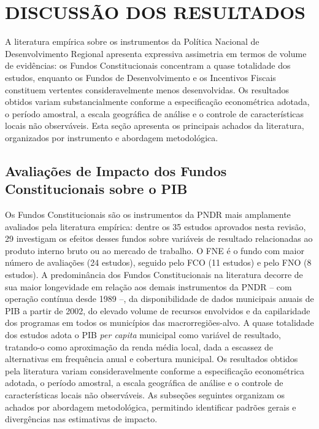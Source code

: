 
\section{DISCUSSÃO DOS RESULTADOS}
\label{sec:results_syst_review}

A literatura empírica sobre os instrumentos da Política Nacional de Desenvolvimento Regional apresenta expressiva assimetria em termos de volume de evidências: os Fundos Constitucionais concentram a quase totalidade dos estudos, enquanto os Fundos de Desenvolvimento e os Incentivos Fiscais constituem vertentes consideravelmente menos desenvolvidas. Os resultados obtidos variam substancialmente conforme a especificação econométrica adotada, o período amostral, a escala geográfica de análise e o controle de características locais não observáveis. Esta seção apresenta os principais achados da literatura, organizados por instrumento e abordagem metodológica.

\subsection{Avaliações de Impacto dos Fundos Constitucionais sobre o PIB}
\label{subsec:fc-pib}

Os Fundos Constitucionais são os instrumentos da PNDR mais amplamente avaliados pela literatura empírica: dentre os 35 estudos aprovados nesta revisão, 29 investigam os efeitos desses fundos sobre variáveis de resultado relacionadas ao produto interno bruto ou ao mercado de trabalho. O FNE é o fundo com maior número de avaliações (24 estudos), seguido pelo FCO (11 estudos) e pelo FNO (8 estudos). A predominância dos Fundos Constitucionais na literatura decorre de sua maior longevidade em relação aos demais instrumentos da PNDR -- com operação contínua desde 1989 --, da disponibilidade de dados municipais anuais de PIB a partir de 2002, do elevado volume de recursos envolvidos e da capilaridade dos programas em todos os municípios das macrorregiões-alvo. A quase totalidade dos estudos adota o PIB \textit{per capita} municipal como variável de resultado, tratando-o como aproximação da renda média local, dada a escassez de alternativas em frequência anual e cobertura municipal. Os resultados obtidos pela literatura variam consideravelmente conforme a especificação econométrica adotada, o período amostral, a escala geográfica de análise e o controle de características locais não observáveis. As subseções seguintes organizam os achados por abordagem metodológica, permitindo identificar padrões gerais e divergências nas estimativas de impacto.

